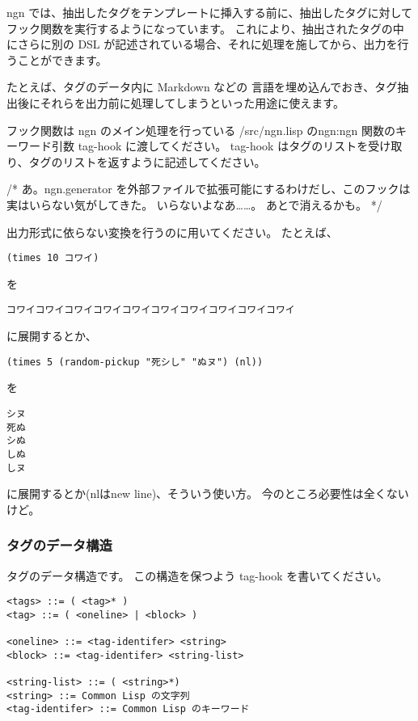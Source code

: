 \documentclass[a4j]{jsarticle}
\begin{document}
ngn では、抽出したタグをテンプレートに挿入する前に、抽出したタグに対してフック関数を実行するようになっています。
これにより、抽出されたタグの中にさらに別の DSL が記述されている場合、それに処理を施してから、出力を行うことができます。

たとえば、タグのデータ内に Markdown などの 言語を埋め込んでおき、タグ抽出後にそれらを出力前に処理してしまうといった用途に使えます。

フック関数は ngn のメイン処理を行っている /src/ngn.lisp のngn:ngn 関数のキーワード引数 tag-hook に渡してください。
tag-hook はタグのリストを受け取り、タグのリストを返すように記述してください。

/* 
あ。ngn.generator を外部ファイルで拡張可能にするわけだし、このフックは実はいらない気がしてきた。
いらないよなあ……。
あとで消えるかも。
 */

出力形式に依らない変換を行うのに用いてください。
たとえば、
\begin{lstlisting}
(times 10 コワイ)
\end{lstlisting}
を
\begin{lstlisting}
コワイコワイコワイコワイコワイコワイコワイコワイコワイコワイ
\end{lstlisting}
に展開するとか、
\begin{lstlisting}
(times 5 (random-pickup "死シし" "ぬヌ") (nl))
\end{lstlisting}
を
\begin{lstlisting}
シヌ
死ぬ
シぬ
しぬ
しヌ
\end{lstlisting}
に展開するとか(nlはnew line)、そういう使い方。
今のところ必要性は全くないけど。


\subsubsection{タグのデータ構造}
タグのデータ構造です。
この構造を保つよう tag-hook を書いてください。

\begin{lstlisting}[caption=タグのデータ構造]
<tags> ::= ( <tag>* )
<tag> ::= ( <oneline> | <block> )

<oneline> ::= <tag-identifer> <string>
<block> ::= <tag-identifer> <string-list>

<string-list> ::= ( <string>*)
<string> ::= Common Lisp の文字列
<tag-identifer> ::= Common Lisp のキーワード

\end{lstlisting}
\end{document}
